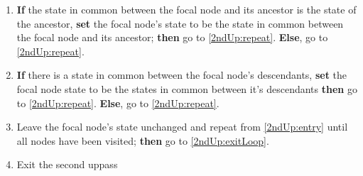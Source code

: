 \documentclass[a4paper,12pt]{article}
\begin{document}
\begin{enumerate}
    \item \label{2ndUp:DescenApp2} \textbf{If} the state in common between the focal node and its ancestor is the state of the ancestor, \textbf{set} the focal node's state to be the state in common between the focal node and its ancestor; \textbf{then} go to \ref{2ndUp:repeat}. \textbf{Else}, go to \ref{2ndUp:repeat}.
    \item \label{2ndUp:AncInapp} \textbf{If} there is a state in common between the focal node's descendants, \textbf{set} the focal node state to be the states in common between it's descendants \textbf{then} go to \ref{2ndUp:repeat}. \textbf{Else}, go to \ref{2ndUp:repeat}.
    \item \label{2ndUp:repeat} Leave the focal node's state unchanged and repeat from \ref{2ndUp:entry} until all nodes have been visited; \textbf{then} go to \ref{2ndUp:exitLoop}.
    \item \label{2ndUp:exitLoop} Exit the second uppass
\end{enumerate}
\end{document}
